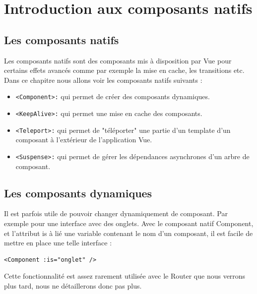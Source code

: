 \section{Introduction aux composants natifs}
\subsection{Les composants natifs}
Les composants natifs sont des composants mis à disposition par {\color{monOrange}Vue} pour certains effets avancés comme par exemple la mise en cache, les transitions etc. Dans ce chapitre nous allons voir les composants natifs suivants :
\begin{itemize}
\item {\tt <Component>:} qui permet de créer des composants dynamiques.
\item {\tt <KeepAlive>:} qui permet une mise en cache des composants.
\item {\tt <Teleport>:} qui permet de "téléporter" une partie d'un {\color{monOrange}template} d'un composant à l'extérieur de l'application {\color{monOrange}Vue}.
\item {\tt <Suspense>:} qui permet de gérer les dépendances asynchrones d'un arbre de composant.
\end{itemize}
\subsection{Les composants dynamiques}
Il est parfois utile de pouvoir changer dynamiquement de composant. Par exemple pour une interface avec des onglets. Avec le composant natif {\color{monOrange}Component}, et l'attribut {\color{monOrange}is} à lié une variable contenant le nom d'un composant, il est facile de mettre en place une telle interface :
\begin{verbatim}
<Component :is="onglet" />
\end{verbatim}
Cette fonctionnalité est assez rarement utilisée avec le {\color{monOrange}Router} que nous verrons plus tard, nous ne détaillerons donc pas plus.
